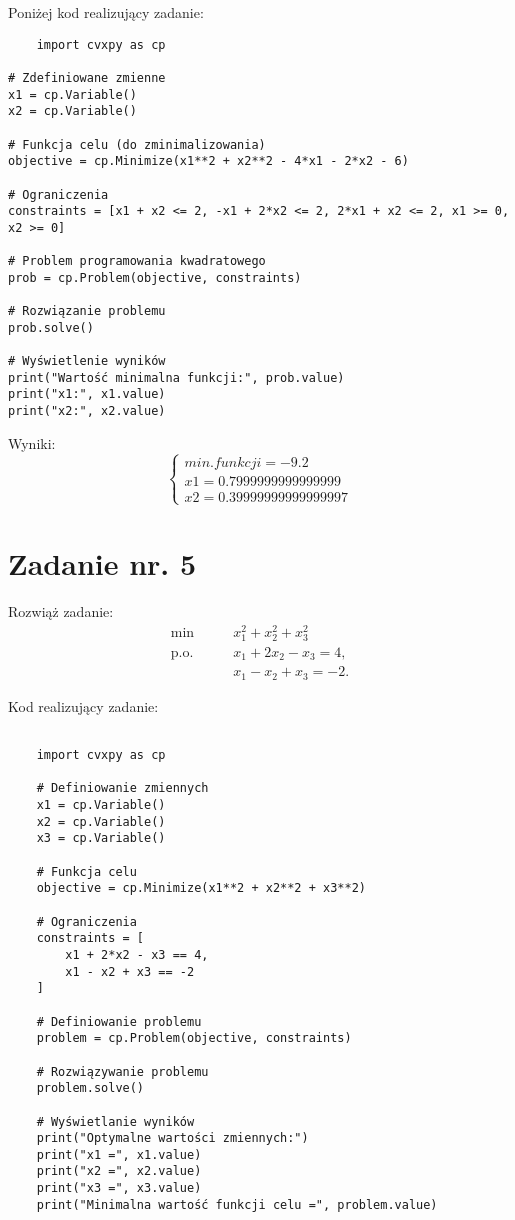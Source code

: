 \documentclass{article}
\begin{document}
Poniżej kod realizujący zadanie:

\begin{lstlisting}
    import cvxpy as cp

# Zdefiniowane zmienne
x1 = cp.Variable()
x2 = cp.Variable()

# Funkcja celu (do zminimalizowania)
objective = cp.Minimize(x1**2 + x2**2 - 4*x1 - 2*x2 - 6)

# Ograniczenia
constraints = [x1 + x2 <= 2, -x1 + 2*x2 <= 2, 2*x1 + x2 <= 2, x1 >= 0, x2 >= 0]

# Problem programowania kwadratowego
prob = cp.Problem(objective, constraints)

# Rozwiązanie problemu
prob.solve()

# Wyświetlenie wyników
print("Wartość minimalna funkcji:", prob.value)
print("x1:", x1.value)
print("x2:", x2.value)

\end{lstlisting}

Wyniki:
\begin{equation}
    \begin{cases}
        min. funkcji = -9.2\\
        x1 = 0.7999999999999999\\
        x2 = 0.39999999999999997
    \end{cases}
\end{equation}

\section{Zadanie nr. 5}

Rozwiąż zadanie:\\
\begin{align*}
    \min &\qquad x_1^2 + x_2^2 + x_3^2 \\
    \text{p.o.} &\qquad x_1 + 2x_2 - x_3 = 4, \\
    &\qquad x_1 -x_2 +x_3 = -2.
    \end{align*}


Kod realizujący zadanie:
\begin{lstlisting}
    
    import cvxpy as cp

    # Definiowanie zmiennych
    x1 = cp.Variable()
    x2 = cp.Variable()
    x3 = cp.Variable()
    
    # Funkcja celu
    objective = cp.Minimize(x1**2 + x2**2 + x3**2)
    
    # Ograniczenia
    constraints = [
        x1 + 2*x2 - x3 == 4,
        x1 - x2 + x3 == -2
    ]
    
    # Definiowanie problemu
    problem = cp.Problem(objective, constraints)
    
    # Rozwiązywanie problemu
    problem.solve()
    
    # Wyświetlanie wyników
    print("Optymalne wartości zmiennych:")
    print("x1 =", x1.value)
    print("x2 =", x2.value)
    print("x3 =", x3.value)
    print("Minimalna wartość funkcji celu =", problem.value)
    

\end{lstlisting}
\end{document}
